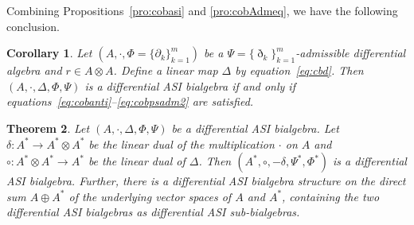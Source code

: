 \documentclass[pdftex]{sigma}
\numberwithin{equation}{section}
\newtheorem{Theorem}{Theorem}[section]
\newtheorem{Corollary}[Theorem]{Corollary}
\begin{document}
Combining Propositions~\ref{pro:cobasi} and \ref{pro:cobAdmeq}, we have the following conclusion.
\begin{Corollary}\label{cor:cobdasiCon}
 Let $(A, \cdot, \Phi = \{\partial_k\}_{k=1}^m)$ be a $\Psi = \{\eth_k\}_{k=1}^m$-admissible differential algebra and $r \in A \otimes A$.
 Define a linear map $\Delta$ by equation~\eqref{eq:cbd}. Then $(A, \cdot, \Delta, \Phi, \Psi)$ is a differential ASI bialgebra if and only if
 equations~\eqref{eq:cobanti}--\eqref{eq:cobpsadm2} are satisfied.
\end{Corollary}

\begin{Theorem}
 Let $(A, \cdot, \Delta, \Phi, \Psi)$ be a differential ASI bialgebra.
 Let $\delta\colon A^* \to A^* \otimes A^*$ be the linear dual of the multiplication $\cdot$ on $A$ and $\circ\colon A^* \otimes A^* \to A^*$ be the linear dual of $\Delta$.
 Then $(A^*, \circ, -\delta, \Psi^*, \Phi^*)$ is a differential ASI bialgebra.
 Further, there is a differential ASI bialgebra structure on the direct sum $A \oplus A^*$ of the underlying vector spaces of $A$ and $A^*$, containing the two differential ASI bialgebras as differential ASI sub-bialgebras.
\end{Theorem}
\end{document}
